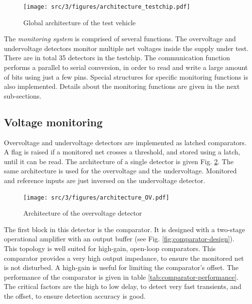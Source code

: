 \begin{figure}[h]
  \centering
  \texttt{[image: src/3/figures/architecture\_testchip.pdf]}
  \caption{Global architecture of the test vehicle}
  \label{architecture_testchip}
\end{figure}

The \textit{monitoring system} is comprised of several functions.
The overvoltage and undervoltage detectors monitor multiple net voltages inside the supply under test.
There are in total 35 detectors in the testchip.
The communication function performs a parallel to serial conversion, in order to read and write a large amount of bits using just a few pins.
Special structures for specific monitoring functions is also implemented.
Details about the monitoring functions are given in the next sub-sections.

\subsection{Voltage monitoring}

Overvoltage and undervoltage detectors are implemented as latched comparators.
A flag is raised if a monitored net crosses a threshold, and stored using a latch, until it can be read.
The architecture of a single detector is given Fig. \ref{fig:architecture-ov}.
The same architecture is used for the overvoltage and the undervoltage.
Monitored and reference inputs are just inversed on the undervoltage detector.

\begin{figure}[!h]
  \centering
  \texttt{[image: src/3/figures/architecture\_OV.pdf]}
  \caption{Architecture of the overvoltage detector}
  \label{fig:architecture-ov}
\end{figure}

The first block in this detector is the comparator.
It is designed with a two-stage operational amplifier with an output buffer (see Fig. \ref{fig:comparator-design}).
This topology is well suited for high-gain, open-loop comparators.
This comparator provides a very high output impedance, to ensure the monitored net is not disturbed.
A high-gain is useful for limiting the comparator's offset.
The performance of the comparator is given in table \ref{tab:comparator-performance}.
The critical factors are the high to low delay, to detect very fast transients, and the offset, to ensure detection accuracy is good.

